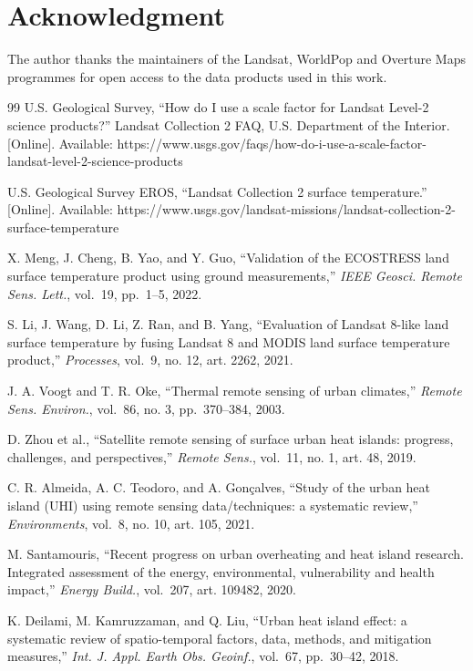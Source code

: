 \section{Acknowledgment}\label{acknowledgment}

The author thanks the maintainers of the Landsat, WorldPop and Overture Maps programmes for open
access to the data products used in this work.

\begin{thebibliography}{99}
 U.S. Geological Survey, ``How do I use a scale factor for Landsat Level-2 science products?''
Landsat Collection 2 FAQ, U.S. Department of the Interior. {[}Online{]}. Available:
https://www.usgs.gov/faqs/how-do-i-use-a-scale-factor-landsat-level-2-science-products


 U.S. Geological Survey EROS, ``Landsat Collection 2 surface temperature.'' {[}Online{]}. Available:
https://www.usgs.gov/landsat-missions/landsat-collection-2-surface-temperature


 X. Meng, J. Cheng, B. Yao, and Y. Guo, ``Validation of the ECOSTRESS land surface temperature
product using ground measurements,'' \emph{IEEE Geosci. Remote Sens. Lett.}, vol.~19, pp.~1--5, 2022.


 S. Li, J. Wang, D. Li, Z. Ran, and B. Yang, ``Evaluation of Landsat 8-like land surface temperature
by fusing Landsat 8 and MODIS land surface temperature product,'' \emph{Processes}, vol.~9, no. 12,
art. 2262, 2021.


 J. A. Voogt and T. R. Oke, ``Thermal remote sensing of urban climates,'' \emph{Remote Sens. Environ.},
vol.~86, no. 3, pp.~370--384, 2003.


 D. Zhou et al., ``Satellite remote sensing of surface urban heat islands: progress, challenges, and
perspectives,'' \emph{Remote Sens.}, vol.~11, no. 1, art. 48, 2019.


 C. R. Almeida, A. C. Teodoro, and A. Gonçalves, ``Study of the urban heat island (UHI) using remote
sensing data/techniques: a systematic review,'' \emph{Environments}, vol.~8, no. 10, art. 105, 2021.


 M. Santamouris, ``Recent progress on urban overheating and heat island research. Integrated
assessment of the energy, environmental, vulnerability and health impact,'' \emph{Energy Build.}, vol.~207,
art. 109482, 2020.


 K. Deilami, M. Kamruzzaman, and Q. Liu, ``Urban heat island effect: a systematic review of
spatio-temporal factors, data, methods, and mitigation measures,'' \emph{Int. J. Appl. Earth Obs.
Geoinf.}, vol.~67, pp.~30--42, 2018.



\end{thebibliography}

